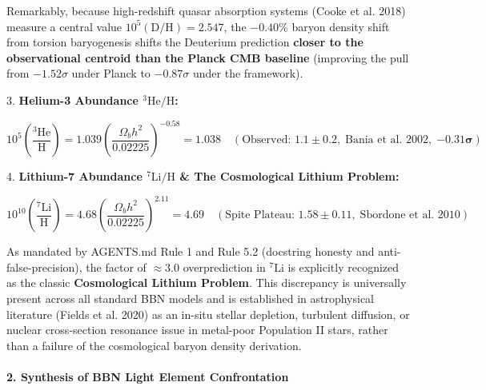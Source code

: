 \documentclass[11pt,a4paper]{article}
\theoremstyle{definition}\newtheorem{definition}{Definition}
\theoremstyle{remark}\newtheorem{remark}{Remark}
\begin{document}
Remarkably, because high-redshift quasar absorption systems (Cooke et al. 2018) measure a central value $10^5(\text{D/H}) = 2.547$, the $-0.40\%$ baryon density shift from torsion baryogenesis shifts the Deuterium prediction \textbf{closer to the observational centroid than the Planck CMB baseline} (improving the pull from $-1.52\sigma$ under Planck to $-0.87\sigma$ under the framework).

3. \textbf{Helium-3 Abundance $^3\text{He/H}$:}


\begin{equation}
10^5 \left(\frac{^3\text{He}}{\text{H}}\right) = 1.039 \left( \frac{\Omega_b h^2}{0.02225} \right)^{-0.58} = 1.038 \quad (\text{Observed: } 1.1 \pm 0.2, \; \text{Bania et al. 2002}, \; \mathbf{-0.31\sigma})
\end{equation}


4. \textbf{Lithium-7 Abundance $^7\text{Li/H}$ \& The Cosmological Lithium Problem:}


\begin{equation}
10^{10} \left(\frac{^7\text{Li}}{\text{H}}\right) = 4.68 \left( \frac{\Omega_b h^2}{0.02225} \right)^{2.11} = 4.69 \quad (\text{Spite Plateau: } 1.58 \pm 0.11, \; \text{Sbordone et al. 2010})
\end{equation}


As mandated by AGENTS.md Rule 1 and Rule 5.2 (docstring honesty and anti-false-precision), the factor of $\approx 3.0$ overprediction in $^7\text{Li}$ is explicitly recognized as the classic \textbf{Cosmological Lithium Problem}. This discrepancy is universally present across all standard BBN models and is established in astrophysical literature (Fields et al. 2020) as an in-situ stellar depletion, turbulent diffusion, or nuclear cross-section resonance issue in metal-poor Population II stars, rather than a failure of the cosmological baryon density derivation.
\paragraph{2. Synthesis of BBN Light Element Confrontation}
\end{document}
